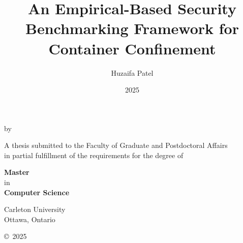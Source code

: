\documentclass[12pt]{report}
\begin{document}
	\title{An Empirical-Based Security Benchmarking Framework for Container Confinement}
\author{Huzaifa Patel}
\date{2025}

\makeatletter
\begin{titlepage}
     \begin{center}
        \vspace*{3cm} 

        {\LARGE \textbf{\@title} \par} 

        \vspace{0.5cm}

        \vspace{2cm}
        \large{by}
        \vspace{0.5cm}

        {\Large \textbf{\@author}} 

        \vfill

        {\large A thesis submitted to the Faculty of Graduate and Postdoctoral Affairs\\
        in partial fulfillment of the requirements for the degree of}

        \vspace{1cm}

        \large{{\textbf{Master}} \\
        {in} \\
        {\textbf{Computer Science}}}
        

        \vspace{2cm}

        \large{Carleton University\\
        Ottawa, Ontario}

        \vspace{1.5cm}


        \vfill

        \copyright{}~2025 \@author
    \end{center}
\end{titlepage}
\makeatother 	\tableofcontents
	\listoftables
	\listoffigures
	\printglossary[type=acronym, title=Nomenclature]
	\fontsize{12pt}{14pt} \selectfont
\end{document}

